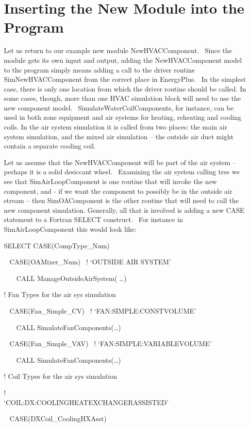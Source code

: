 \section{Inserting the New Module into the Program}\label{inserting-the-new-module-into-the-program}

Let us return to our example new module NewHVACComponent.~ Since the module gets its own input and output, adding the NewHVACComponent model to the program simply means adding a call to the driver routine SimNewHVACComponent from the correct place in EnergyPlus.~ In the simplest case, there is only one location from which the driver routine should be called. In some cases, though, more than one HVAC simulation block will need to use the new component model.~ SimulateWaterCoilComponents, for instance, can be used in both zone equipment and air systems for heating, reheating and cooling coils. In the air system simulation it is called from two places: the main air system simulation, and the mixed air simulation -- the outside air duct might contain a separate cooling coil.

Let us assume that the NewHVACComponent will be part of the air system -- perhaps it is a solid desiccant wheel.~ Examining the air system calling tree we see that SimAirLoopComponent is one routine that will invoke the new component, and - if we want the component to possibly be in the outside air stream -- then SimOAComponent is the other routine that will need to call the new component simulation. Generally, all that is involved is adding a new CASE statement to a Fortran SELECT construct.~ For instance in SimAirLoopComponent this would look like:

SELECT CASE(CompType\_Num)

~ CASE(OAMixer\_Num)~ ! `OUTSIDE AIR SYSTEM'

~~~ CALL ManageOutsideAirSystem( \ldots{})

! Fan Types for the air sys simulation

~ CASE(Fan\_Simple\_CV)~ ! `FAN:SIMPLE:CONSTVOLUME'

~~~ CALL SimulateFanComponents(\ldots{})

~ CASE(Fan\_Simple\_VAV)~ ! `FAN:SIMPLE:VARIABLEVOLUME'

~~~ CALL SimulateFanComponents(\ldots{})

! Coil Types for the air sys simulation

!~~~~~~~~~~~~~~~~~~~~~~~~ `COIL:DX:COOLINGHEATEXCHANGERASSISTED'

~ CASE(DXCoil\_CoolingHXAsst)

